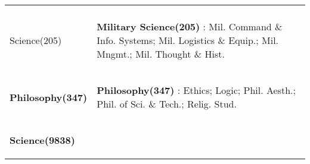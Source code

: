 {\begin{table}[p]
{\begin{tabular}{>{\raggedright\arraybackslash}p{3.5cm}>{\raggedright\arraybackslash}p{17cm}}
\begin{mybox}[colback=magenta!80!black!60, coltext=white, height=1cm]{}\textbf{Military \\Science(205)}\end{mybox} &\begin{minipage}[t]{17cm}
\begin{mybox}[colback=magenta!20, coltext=black, height=1cm]{}
\textbf{\textcolor{magenta!80!black!60}{Military Science(205)}} : Mil. Command \& Info. Systems; Mil. Logistics \& Equip.; Mil. Mngmt.; Mil. Thought \& Hist.\end{mybox}
\end{minipage}\\
\begin{mybox}[colback=lime!80!black!60, coltext=white, height=0.8cm]{}\textbf{Philosophy(347)}\end{mybox} &\begin{minipage}[t]{17cm}
\begin{mybox}[colback=lime!20, coltext=black, height=0.8cm]{}
\textbf{\textcolor{lime!80!black!60}{Philosophy(347)}} : Ethics; Logic; Phil. Aesth.; Phil. of Sci. \& Tech.; Relig. Stud.\end{mybox}
\end{minipage}\\
\begin{mybox}[colback=green!60!black!60, coltext=white, height=10.5cm]{}\textbf{Science(9838)}\end{mybox} &\begin{minipage}[t]{17cm}
\begin{mybox}[colback=green!20!white!60, coltext=black, height=10.5cm]{}

\end{mybox}
\end{minipage}
\end{tabular}}
\end{table}}
